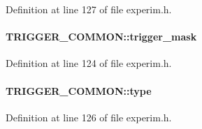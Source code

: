 Definition at line 127 of file experim.h.
\paragraph[{trigger\_\-mask}]{ {\bf TRIGGER\_\-COMMON::trigger\_\-mask}}\hfill\label{structTRIGGER__COMMON_ae23098eb5a08a449a629511072727ca4}


Definition at line 124 of file experim.h.
\paragraph[{type}]{ {\bf TRIGGER\_\-COMMON::type}}\hfill\label{structTRIGGER__COMMON_a6e41366298a6416ec320148202ee30cb}


Definition at line 126 of file experim.h.